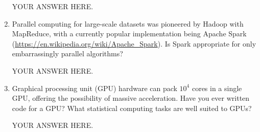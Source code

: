 \documentclass[12pt]{article}
\begin{document}
\begin{enumerate}
  YOUR ANSWER HERE.

\item Parallel computing for large-scale datasets was pioneered by Hadoop with MapReduce, with a currently popular implementation being Apache Spark (\url{https://en.wikipedia.org/wiki/Apache_Spark}). Is Spark appropriate for only embarrassingly parallel algorithms?

  YOUR ANSWER HERE.

\item Graphical processing unit (GPU) hardware can pack $10^4$ cores in a single GPU, offering the possibility of massive acceleration. Have you ever written code for a GPU? What statistical computing tasks are well suited to GPUs?

  YOUR ANSWER HERE.

\end{enumerate}
\end{document}
